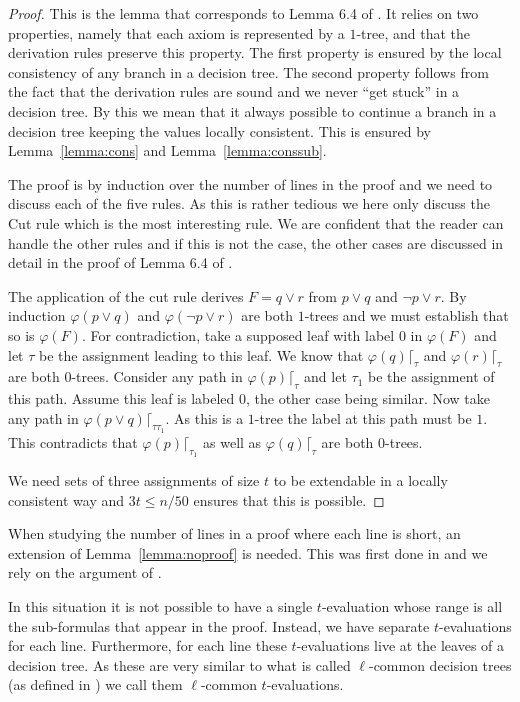\documentclass{theoretics}
\begin{document}
\begin{proof}
This is the lemma that corresponds to Lemma 6.4 of
\cite{jhtseitin}.
It relies on two properties, namely that each axiom is represented
by a $1$-tree, and that the derivation rules preserve this property.
The first property is ensured by the local consistency
of any branch in a decision tree.  The second property
follows from the fact that the derivation rules are sound
and we never ``get stuck'' in a decision tree.  By this
we mean that it always possible to continue a branch
in a decision tree keeping the values locally consistent.
This is ensured by Lemma~\ref{lemma:cons} and Lemma~\ref{lemma:conssub}.

The proof is by induction over the number of lines in the proof
and we need to discuss each of the five rules.  As this is
rather tedious we here only discuss the Cut rule which
is the most interesting rule.  We are confident
that the reader can handle the other rules and if this is not
the case, the other cases are discussed in detail in the
proof of Lemma 6.4 of \cite{jhtseitin}.

The application of the cut rule derives $F= q \lor r$ from
$p \lor q$ and $\neg p \lor r$.  By induction $\varphi(p \lor q)$
and $\varphi (\neg p \lor r)$ are both $1$-trees and we must
establish that so is $\varphi (F)$.
For contradiction, take a supposed leaf with label $0$ 
in $\varphi(F)$ and let $\tau$ be the assignment leading to this leaf. 
We know that $\varphi(q)\lceil_\tau$ and $\varphi(r)\lceil_\tau$ are
both $0$-trees.
Consider any path in $\varphi (p) \lceil_\tau$ and let $\tau_1$ be
the assignment of this path.  Assume this leaf is
labeled $0$, the other case being similar.  Now take
any path in $\varphi(p \lor q)\lceil_{\tau \tau_1}$.
As this is a $1$-tree the label at this path must
be $1$.  This contradicts that $\varphi(p) \lceil_{\tau_1}$
as well as $\varphi(q) \lceil_{\tau}$ are both $0$-trees.

We need sets of three assignments of size $t$ to be extendable
in  a locally consistent way and $3t \leq n/50$ ensures
that this is possible.
\end{proof}

When studying the number of lines in a proof where each line
is short, an extension of Lemma~\ref{lemma:noproof} is needed.
This was first done in \cite{PRT21} and we rely on
the argument of \cite{jhkr}.  

In this situation it is not possible to have
a single $t$-evaluation whose range is all the sub-formulas
that appear in the proof.  Instead, we have separate
$t$-evaluations for each line.  Furthermore, for each
line these $t$-evaluations live at the leaves of a decision
tree.  As these are very similar to what is called $\ell$-common decision
trees (as defined in \cite{jhmultiswitch}) we call them 
$\ell$-common $t$-evaluations.
\end{document}
